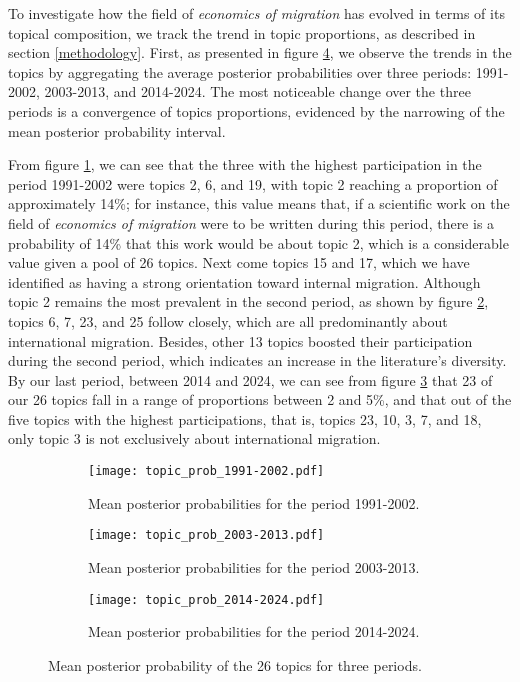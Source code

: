 To investigate how the field of \textit{economics of migration} has evolved in terms of its topical composition, we track the trend in topic proportions, as described in section \ref{methodology}. First, as presented in figure \ref{fig:topics_posterior}, we observe the trends in the topics by aggregating the average posterior probabilities over three periods: 1991-2002, 2003-2013, and 2014-2024. The most noticeable change over the three periods is a convergence of topics proportions, evidenced by the narrowing of the mean posterior probability interval.

From figure \ref{fig:topics_posterior1991}, we can see that the three with the highest participation in the period 1991-2002 were topics 2, 6, and 19, with topic 2 reaching a proportion of approximately 14\%; for instance, this value means that, if a scientific work on the field of \textit{economics of migration} were to be written during this period, there is a probability of 14\% that this work would be about topic 2, which is a considerable value given a pool of 26 topics. Next come topics 15 and 17, which we have identified as having a strong orientation toward internal migration. Although topic 2 remains the most prevalent in the second period, as shown by figure \ref{fig:topics_posterior2003}, topics 6, 7, 23, and 25 follow closely, which are all predominantly about international migration. Besides, other 13 topics boosted their participation during the second period, which indicates an increase in the literature's diversity. By our last period, between 2014 and 2024, we can see from figure \ref{fig:topics_posterior2014} that 23 of our 26 topics fall in a range of proportions between 2 and 5\%, and that out of the five topics with the highest participations, that is, topics 23, 10, 3, 7, and 18, only topic 3 is not exclusively about international migration. 

\begin{figure}[ht!]
    \centering 
    \begin{subfigure}[b]{0.49\textwidth}
        \centering
        \texttt{[image: topic\_prob\_1991-2002.pdf]}
        \caption{Mean posterior probabilities for the period 1991-2002.}
        \label{fig:topics_posterior1991}
    \end{subfigure}
    \hfill 
    \begin{subfigure}[b]{0.49\textwidth}
        \centering
        \texttt{[image: topic\_prob\_2003-2013.pdf]}
        \caption{Mean posterior probabilities for the period 2003-2013.}
        \label{fig:topics_posterior2003}
    \end{subfigure}
    \hfill
    \begin{subfigure}[b]{0.49\textwidth}
        \centering
        \texttt{[image: topic\_prob\_2014-2024.pdf]}
        \caption{Mean posterior probabilities for the period 2014-2024.}
        \label{fig:topics_posterior2014}
    \end{subfigure}  
\caption{Mean posterior probability of the 26 topics for three periods.}
\label{fig:topics_posterior}
\end{figure}

